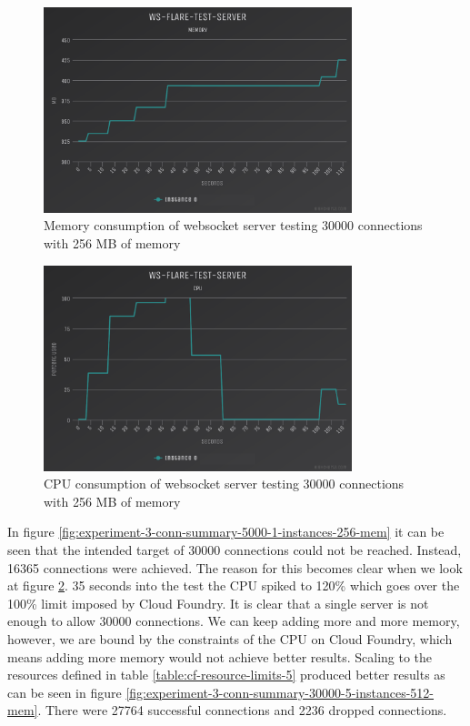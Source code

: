 \begin{figure}[H]
  \centering
    \includegraphics[width=0.8\textwidth]{figures/experiments/experiment-1/node-js/memory-30000-256-memory.png}
    \caption{Memory consumption of websocket server testing 30000 connections with 256 MB of memory}
    \label{fig:experiment-3-memory-5000-1-instances-256-mem}
\end{figure}

\begin{figure}[H]
  \centering
    \includegraphics[width=0.8\textwidth]{figures/experiments/experiment-1/node-js/cpu-30000-256-memory.png}
    \caption{CPU consumption of websocket server testing 30000 connections with 256 MB of memory}
    \label{fig:experiment-3-cpu-5000-1-instances-256-mem}
\end{figure}

In figure \ref{fig:experiment-3-conn-summary-5000-1-instances-256-mem} it can be seen that the intended target of 30000 connections could not be reached. Instead, 16365 connections were achieved. The reason for this becomes clear when we look at figure  \ref{fig:experiment-3-cpu-5000-1-instances-256-mem}. 35 seconds into the test the CPU spiked to 120\% which goes over the 100\% limit imposed by Cloud Foundry. It is clear that a single server is not enough to allow 30000 connections. We can keep adding more and more memory, however, we are bound by the constraints of the CPU on Cloud Foundry, which means adding more memory would not achieve better results. Scaling to the resources defined in table \ref{table:cf-resource-limits-5} produced better results as can be seen in figure \ref{fig:experiment-3-conn-summary-30000-5-instances-512-mem}. There were 27764 successful connections and 2236 dropped connections.

